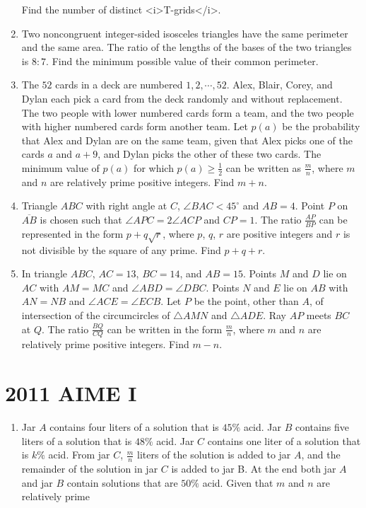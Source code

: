 \documentclass{article}
\begin{document}
\begin{enumerate}[label=\arabic*., itemsep=0.5em]
Find the number of distinct <i>T-grids</i>.\par \vspace{0.5em}\item Two noncongruent integer-sided isosceles triangles have the same perimeter and the same area. The ratio of the lengths of the bases of the two triangles is $8: 7$. Find the minimum possible value of their common perimeter.\par \vspace{0.5em}\item The $52$ cards in a deck are numbered $1, 2, \cdots, 52$. Alex, Blair, Corey, and Dylan each pick a card from the deck randomly and without replacement. The two people with lower numbered cards form a team, and the two people with higher numbered cards form another team. Let $p(a)$ be the probability that Alex and Dylan are on the same team, given that Alex picks one of the cards $a$ and $a+9$, and Dylan picks the other of these two cards. The minimum value of $p(a)$ for which $p(a)\ge\frac{1}{2}$ can be written as $\frac{m}{n}$, where $m$ and $n$ are relatively prime positive integers. Find $m+n$.\par \vspace{0.5em}\item Triangle $ABC$ with right angle at $C$, $\angle BAC < 45^\circ$ and $AB = 4$. Point $P$ on $\overline{AB}$ is chosen such that $\angle APC = 2\angle ACP$ and $CP = 1$. The ratio $\frac{AP}{BP}$ can be represented in the form $p + q\sqrt{r}$, where $p$, $q$, $r$ are positive integers and $r$ is not divisible by the square of any prime. Find $p+q+r$.\par \vspace{0.5em}\item In triangle $ABC$, $AC=13$, $BC=14$, and $AB=15$. Points $M$ and $D$ lie on $AC$ with $AM=MC$ and $\angle ABD = \angle DBC$. Points $N$ and $E$ lie on $AB$ with $AN=NB$ and $\angle ACE = \angle ECB$. Let $P$ be the point, other than $A$, of intersection of the circumcircles of $\triangle AMN$ and $\triangle ADE$. Ray $AP$ meets $BC$ at $Q$. The ratio $\frac{BQ}{CQ}$ can be written in the form $\frac{m}{n}$, where $m$ and $n$ are relatively prime positive integers. Find $m-n$.\par \vspace{0.5em}\end{enumerate}\newpage\section*{2011 AIME I}\begin{enumerate}[label=\arabic*., itemsep=0.5em]\item Jar $A$ contains four liters of a solution that is $45\%$ acid. Jar $B$ contains five liters of a solution that is $48\%$ acid. Jar $C$ contains one liter of a solution that is $k\%$ acid. From jar $C$, $\frac{m}{n}$ liters of the solution is added to jar $A$, and the remainder of the solution in jar $C$ is added to jar B. At the end both jar $A$ and jar $B$ contain solutions that are $50\%$ acid. Given that $m$ and $n$ are relatively prime 
\end{enumerate}
\end{document}
